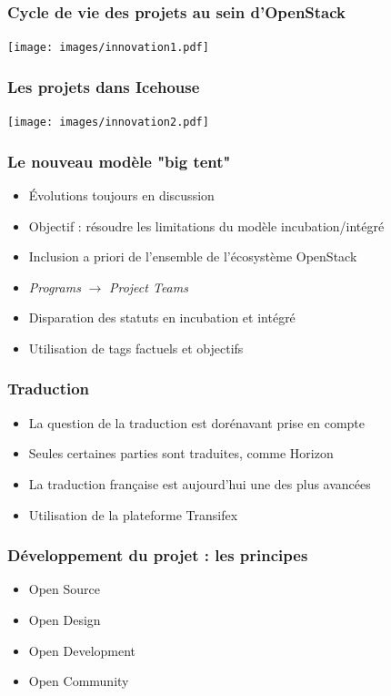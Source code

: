   \begin{frame}
    \frametitle{Cycle de vie des projets au sein d'OpenStack}
    \texttt{[image: images/innovation1.pdf]}
  \end{frame}

  \begin{frame}
    \frametitle{Les projets dans Icehouse}
    \texttt{[image: images/innovation2.pdf]}
  \end{frame}

  \begin{frame}
    \frametitle{Le nouveau modèle "big tent"}
    \begin{itemize}
      \item Évolutions toujours en discussion
      \item Objectif : résoudre les limitations du modèle incubation/intégré
      \item Inclusion {a priori} de l'ensemble de l'écosystème OpenStack
      \item \textit{Programs} $\rightarrow$ \textit{Project Teams}
      \item Disparation des statuts en incubation et intégré
      \item Utilisation de tags factuels et objectifs
    \end{itemize}
  \end{frame}

  \begin{frame}
    \frametitle{Traduction}
    \begin{itemize}
      \item La question de la traduction est dorénavant prise en compte
      \item Seules certaines parties sont traduites, comme Horizon
      \item La traduction française est aujourd'hui une des plus avancées
      \item Utilisation de la plateforme Transifex
    \end{itemize}
  \end{frame}

  \begin{frame}
    \frametitle{Développement du projet : les principes}
    \begin{itemize}
      \item Open Source
      \item Open Design
      \item Open Development
      \item Open Community
    \end{itemize}
  \end{frame}

